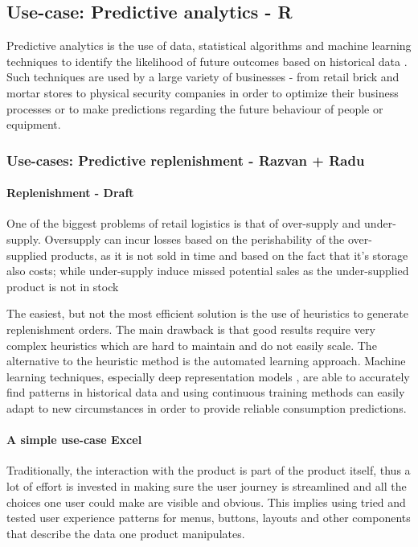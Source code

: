 \documentclass{article}
\begin{document}
\subsection{Use-case: Predictive analytics - R}
Predictive analytics is the use of data, statistical algorithms and machine learning techniques to identify the likelihood of future outcomes based on historical data \cite{klimberg2016fundamentals}. Such techniques are used by a large variety of businesses - from retail brick and mortar stores to physical security companies in order to optimize their business processes or to make predictions regarding the future behaviour of people or equipment.

\subsubsection{Use-cases: Predictive replenishment - Razvan + Radu}

\paragraph{Replenishment - Draft} One of the biggest problems of retail logistics is that of over-supply and under-supply. Oversupply can incur losses based on the perishability of the over-supplied products, as it is not sold in time and based on the fact that it's storage also costs; while under-supply induce missed potential sales as the under-supplied product is not in stock

The easiest, but not the most efficient solution is the use of heuristics \cite{stefanovic2015collaborative} to generate replenishment orders. The main drawback is that good results require very complex heuristics which are hard to maintain and do not easily scale. The alternative to the heuristic method is the automated learning approach. Machine learning techniques, especially deep representation models \cite{kilimci2019improved}, are able to accurately find patterns in historical data and using continuous training methods can easily adapt to new circumstances in order to provide reliable consumption predictions.

\paragraph{A simple use-case Excel} 
Traditionally, the interaction with the product is part of the product itself, thus a lot of effort is invested in making sure the user journey is streamlined and all the choices one user could make are visible and obvious. This implies using tried and tested user experience patterns for menus, buttons, layouts and other components that describe the data one product manipulates.
\end{document}
